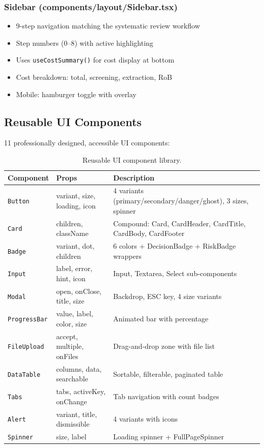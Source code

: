 \documentclass[11pt,a4paper]{article}
\begin{document}
\subsubsection{Sidebar (components/layout/Sidebar.tsx)}

\begin{itemize}[nosep]
  \item 9-step navigation matching the systematic review workflow
  \item Step numbers (0--8) with active highlighting
  \item Uses \texttt{useCostSummary()} for cost display at bottom
  \item Cost breakdown: total, screening, extraction, RoB
  \item Mobile: hamburger toggle with overlay
\end{itemize}

\subsection{Reusable UI Components}

11 professionally designed, accessible UI components:

\begin{table}[H]
\centering\small
\begin{tabular}{lp{3cm}p{5.5cm}}
\toprule
\textbf{Component} & \textbf{Props} & \textbf{Description} \\
\midrule
\texttt{Button} & variant, size, loading, icon & 4 variants (primary/secondary/danger/ghost), 3 sizes, spinner \\
\texttt{Card} & children, className & Compound: Card, CardHeader, CardTitle, CardBody, CardFooter \\
\texttt{Badge} & variant, dot, children & 6 colors + DecisionBadge + RiskBadge wrappers \\
\texttt{Input} & label, error, hint, icon & Input, Textarea, Select sub-components \\
\texttt{Modal} & open, onClose, title, size & Backdrop, ESC key, 4 size variants \\
\texttt{ProgressBar} & value, label, color, size & Animated bar with percentage \\
\texttt{FileUpload} & accept, multiple, onFiles & Drag-and-drop zone with file list \\
\texttt{DataTable} & columns, data, searchable & Sortable, filterable, paginated table \\
\texttt{Tabs} & tabs, activeKey, onChange & Tab navigation with count badges \\
\texttt{Alert} & variant, title, dismissible & 4 variants with icons \\
\texttt{Spinner} & size, label & Loading spinner + FullPageSpinner \\
\bottomrule
\end{tabular}
\caption{Reusable UI component library.}
\end{table}
\end{document}
